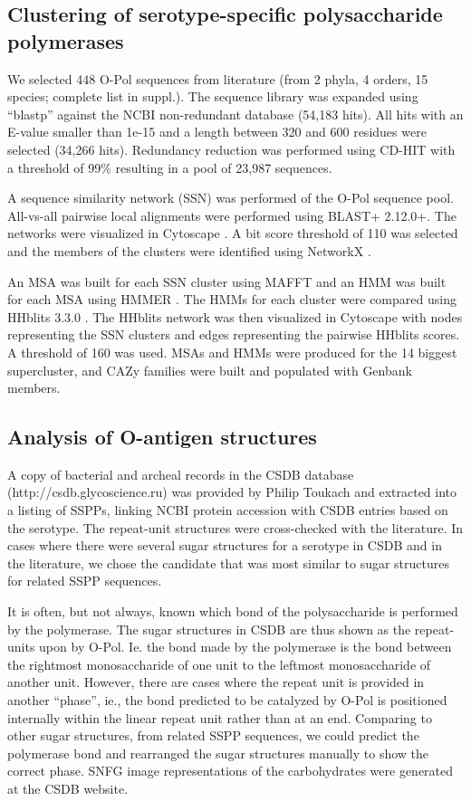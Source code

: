 \documentclass{article}
\begin{document}
\subsection{Clustering of serotype-specific polysaccharide polymerases}
We selected 448 O-Pol sequences from literature (from 2 phyla, 4 orders, 15 species; complete list in suppl.). The sequence library was expanded using “blastp” against the NCBI non-redundant database (54,183 hits). All hits with an E-value smaller than 1e-15 and a length between 320 and 600 residues were selected (34,266 hits). Redundancy reduction was performed using CD-HIT with a threshold of 99\% resulting in a pool of 23,987 sequences.

A sequence similarity network (SSN) was performed of the O-Pol sequence pool. All-vs-all pairwise local alignments were performed using BLAST+ 2.12.0+. The networks were visualized in Cytoscape \cite{shannon_cytoscape_2003}. A bit score threshold of 110 was selected and the members of the clusters were identified using NetworkX \cite{hagberg_exploring_2008}.

An MSA was built for each SSN cluster using MAFFT and an HMM was built for each MSA using HMMER \cite{finn_hmmer_2011}. The HMMs for each cluster were compared using HHblits 3.3.0 \cite{steinegger_hh-suite3_2019}. The HHblits network was then visualized in Cytoscape \cite{shannon_cytoscape_2003} with nodes representing the SSN clusters and edges representing the pairwise HHblits scores. A threshold of 160 was used. MSAs and HMMs were produced for the 14 biggest supercluster, and CAZy families were built and populated with Genbank members.

\subsection{Analysis of O-antigen structures}
A copy of bacterial and archeal records in the CSDB database (http://csdb.glycoscience.ru) was provided by Philip Toukach \cite{toukach_carbohydrate_2016} and extracted into a listing of SSPPs, linking NCBI protein accession with CSDB entries based on the serotype. The repeat-unit structures were cross-checked with the literature. In cases where there were several sugar structures for a serotype in CSDB and in the literature, we chose the candidate that was most similar to sugar structures for related SSPP sequences.

It is often, but not always, known which bond of the polysaccharide is performed by the polymerase. The sugar structures in CSDB are thus shown as the repeat-units upon by O-Pol. Ie. the bond made by the polymerase is the bond between the rightmost monosaccharide of one unit to the leftmost monosaccharide of another unit. However, there are cases where the repeat unit is provided in another “phase”, ie., the bond predicted to be catalyzed by O-Pol is positioned internally within the linear repeat unit rather than at an end. Comparing to other sugar structures, from related SSPP sequences, we could predict the polymerase bond and rearranged the sugar structures manually to show the correct phase. SNFG image representations of the carbohydrates were generated at the CSDB website.
\end{document}
